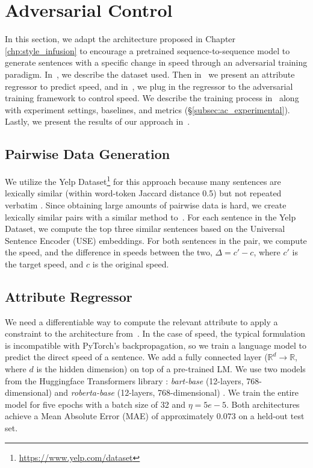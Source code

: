 \section{Adversarial Control}
\label{sec:adversarial_control}

In this section, we adapt the architecture proposed in Chapter \ref{chp:style_infusion} to encourage a pretrained sequence-to-sequence model to generate sentences with a specific change in speed through an adversarial training paradigm. In~, we describe the dataset used. Then in~ we present an attribute regressor to predict speed, and in~, we plug in the regressor to the adversarial training framework to control speed. We describe the training process in~ along with experiment settings, baselines, and metrics (\S\ref{subsec:ac_experimental}). Lastly, we present the results of our approach in~.

\subsection{Pairwise Data Generation}
\label{subsec:ac_data}

We utilize the Yelp Dataset\footnote{\url{https://www.yelp.com/dataset}} for this approach because many sentences are lexically similar (\ie within word-token Jaccard distance 0.5) but not repeated verbatim \citep{guu2018generating}. Since obtaining large amounts of pairwise data is hard, we create lexically similar pairs with a similar method to~. For each sentence in the Yelp Dataset, we compute the top three similar sentences based on the Universal Sentence Encoder (USE) embeddings. For both sentences in the pair, we compute the speed, and the difference in speeds between the two, $\Delta = c' - c$, where $c'$ is the target speed, and $c$ is the original speed. 

\subsection{Attribute Regressor}
\label{subsec:ac_attribute_regressor}

We need a differentiable way to compute the relevant attribute to apply a constraint to the architecture from~. In the case of speed, the typical formulation is incompatible with PyTorch's backpropagation, so we train a language model to predict the direct speed of a sentence. We add a fully connected layer ($\mathbb{R}^d \rightarrow \mathbb{R}$, where $d$ is the hidden dimension) on top of a pre-trained LM. We use two models from the Huggingface Transformers library \citep{wolf2019}: \textit{bart-base} (12-layers, 768-dimensional) \citep{lewis2019bart} and \textit{roberta-base} (12-layers, 768-dimensional) \citep{liu2019roberta}. We train the entire model for five epochs with a batch size of 32 and $\eta = 5e-5$. Both architectures achieve a Mean Absolute Error (MAE) of approximately $0.073$ on a held-out test set.

